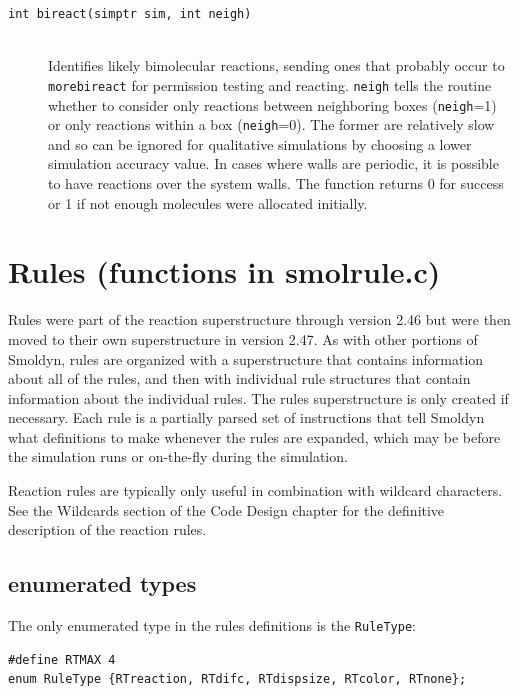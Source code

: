 \documentclass {scrbook}
\newcommand {\ttt} {\texttt}
\begin{document}
\begin{description}
\item[\ttt{int bireact(simptr sim, int neigh)}]
\hfill \\
Identifies likely bimolecular reactions, sending ones that probably occur to \ttt{morebireact} for permission testing and reacting. \ttt{neigh} tells the routine whether to consider only reactions between neighboring boxes (\ttt{neigh}=1) or only reactions within a box (\ttt{neigh}=0). The former are relatively slow and so can be ignored for qualitative simulations by choosing a lower simulation accuracy value. In cases where walls are periodic, it is possible to have reactions over the system walls. The function returns 0 for success or 1 if not enough molecules were allocated initially.

\end{description}

\section{Rules (functions in smolrule.c)}

Rules were part of the reaction superstructure through version 2.46 but were then moved to their own superstructure in version 2.47. As with other portions of Smoldyn, rules are organized with a superstructure that contains information about all of the rules, and then with individual rule structures that contain information about the individual rules. The rules superstructure is only created if necessary. Each rule is a partially parsed set of instructions that tell Smoldyn what definitions to make whenever the rules are expanded, which may be before the simulation runs or on-the-fly during the simulation.

Reaction rules are typically only useful in combination with wildcard characters. See the Wildcards section of the Code Design chapter for the definitive description of the reaction rules.

\subsection{enumerated types}

The only enumerated type in the rules definitions is the \ttt{RuleType}:

\begin{lstlisting}
#define RTMAX 4
enum RuleType {RTreaction, RTdifc, RTdispsize, RTcolor, RTnone};
\end{lstlisting}
\end{document}
